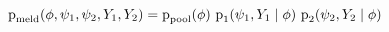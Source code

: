 \begin{equation*}
  \text{p}_{\text{meld}} (\phi, \psi_{1}, \psi_{2}, Y_{1}, Y_{2})
  =
  \text{p}_{\text{pool}}(\phi) \,\,
  \text{p}_{1}(\psi_{1}, Y_{1} \mid \phi) \,\,
  \text{p}_{2}(\psi_{2}, Y_{2} \mid \phi) 
\end{equation*}